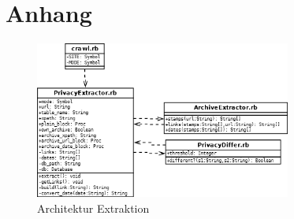 \documentclass{article}
\begin{document}
	\section{Anhang}
	\begin{figure}[ht]
		\centering
		\includegraphics[width=0.75\textwidth]{extraction}
		\caption{Architektur Extraktion}
		\label{fig:uml-ex}
	\end{figure}
\end{document}
